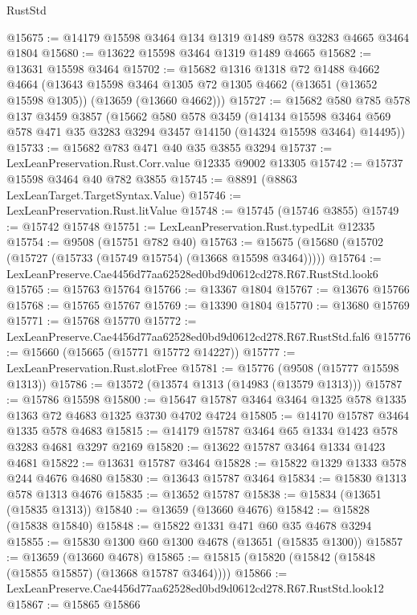 \begin{lexlean}{RustStd}
\begin{coremodule}
@15675 := @14179 @15598 @3464 @134 @1319 @1489 @578 @3283 @4665 @3464 @1804
@15680 := @13622 @15598 @3464 @1319 @1489 @4665
@15682 := @13631 @15598 @3464
@15702 := @15682
    @1316
    @1318
    @72
    @1488
    @4662
    @4664
    (@13643
      @15598
      @3464
      @1305
      @72
      @1305
      @4662
      (@13651 (@13652 @15598 @1305))
      (@13659 (@13660 @4662)))
@15727 := @15682
    @580
    @785
    @578
    @137
    @3459
    @3857
    (@15662
      @580
      @578
      @3459
      (@14134
        @15598
        @3464
        @569
        @578
        @471
        @35
        @3283
        @3294
        @3457
        @14150
        (@14324 @15598 @3464)
        @14495))
@15733 := @15682 @783 @471 @40 @35 @3855 @3294
@15737 := LexLeanPreservation.Rust.Corr.value @12335 @9002 @13305
@15742 := @15737 @15598 @3464 @40 @782 @3855
@15745 := @8891 (@8863 LexLeanTarget.TargetSyntax.Value)
@15746 := LexLeanPreservation.Rust.litValue
@15748 := @15745 (@15746 @3855)
@15749 := @15742 @15748
@15751 := LexLeanPreservation.Rust.typedLit @12335
@15754 := @9508 (@15751 @782 @40)
@15763 := @15675 (@15680 (@15702 (@15727 (@15733 (@15749 @15754) (@13668 @15598 @3464)))))
@15764 := LexLeanPreserve.Cae4456d77aa62528ed0bd9d0612cd278.R67.RustStd.look6
@15765 := @15763 @15764
@15766 := @13367 @1804
@15767 := @13676 @15766
@15768 := @15765 @15767
@15769 := @13390 @1804
@15770 := @13680 @15769
@15771 := @15768 @15770
@15772 := LexLeanPreserve.Cae4456d77aa62528ed0bd9d0612cd278.R67.RustStd.fal6
@15776 := @15660 (@15665 (@15771 @15772 @14227))
@15777 := LexLeanPreservation.Rust.slotFree
@15781 := @15776 (@9508 (@15777 @15598 @1313))
@15786 := @13572 (@13574 @1313 (@14983 (@13579 @1313)))
@15787 := @15786 @15598
@15800 := @15647 @15787 @3464 @3464 @1325 @578 @1335 @1363 @72 @4683 @1325 @3730 @4702 @4724
@15805 := @14170 @15787 @3464 @1335 @578 @4683
@15815 := @14179 @15787 @3464 @65 @1334 @1423 @578 @3283 @4681 @3297 @2169
@15820 := @13622 @15787 @3464 @1334 @1423 @4681
@15822 := @13631 @15787 @3464
@15828 := @15822 @1329 @1333 @578 @244 @4676 @4680
@15830 := @13643 @15787 @3464
@15834 := @15830 @1313 @578 @1313 @4676
@15835 := @13652 @15787
@15838 := @15834 (@13651 (@15835 @1313))
@15840 := @13659 (@13660 @4676)
@15842 := @15828 (@15838 @15840)
@15848 := @15822 @1331 @471 @60 @35 @4678 @3294
@15855 := @15830 @1300 @60 @1300 @4678 (@13651 (@15835 @1300))
@15857 := @13659 (@13660 @4678)
@15865 := @15815 (@15820 (@15842 (@15848 (@15855 @15857) (@13668 @15787 @3464))))
@15866 := LexLeanPreserve.Cae4456d77aa62528ed0bd9d0612cd278.R67.RustStd.look12
@15867 := @15865 @15866

\end{coremodule}
\end{lexlean}
